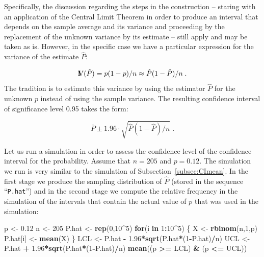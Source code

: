 \documentclass[]{krantz}
\makeatletter
\newenvironment{Shaded}{\begin{snugshade}}{\end{snugshade}}
\newcommand{\ControlFlowTok}[1]{\textcolor[rgb]{0.13,0.29,0.53}{\textbf{#1}}}
\newcommand{\DecValTok}[1]{\textcolor[rgb]{0.00,0.00,0.81}{#1}}
\newcommand{\FloatTok}[1]{\textcolor[rgb]{0.00,0.00,0.81}{#1}}
\newcommand{\KeywordTok}[1]{\textcolor[rgb]{0.13,0.29,0.53}{\textbf{#1}}}
\newcommand{\NormalTok}[1]{#1}
\newcommand{\OperatorTok}[1]{\textcolor[rgb]{0.81,0.36,0.00}{\textbf{#1}}}
\newcommand{\StringTok}[1]{\textcolor[rgb]{0.31,0.60,0.02}{#1}}
\newcommand{\Var}{{\rm I\kern-.3em V}}
\newenvironment{kframe}{%
\medskip{}
\setlength{\fboxsep}{.8em}
 \def\at@end@of@kframe{}%
 \ifinner\ifhmode%
  \def\at@end@of@kframe{\end{minipage}}%
  \begin{minipage}{\columnwidth}%
 \fi\fi%
 \def\FrameCommand##1{\hskip\@totalleftmargin \hskip-\fboxsep
 \colorbox{shadecolor}{##1}\hskip-\fboxsep
     \hskip-\linewidth \hskip-\@totalleftmargin \hskip\columnwidth}%
 \MakeFramed {\advance\hsize-\width
   \@totalleftmargin\z@ \linewidth\hsize
   \@setminipage}}%
 {\par\unskip\endMakeFramed%
 \at@end@of@kframe}
\renewenvironment{Shaded}{\begin{kframe}}{\end{kframe}}
\theoremstyle{definition}
\theoremstyle{definition}
\theoremstyle{definition}
\theoremstyle{remark}
\makeatother
\begin{document}
Specifically, the discussion regarding the steps in the construction --
staring with an application of the Central Limit Theorem in order to
produce an interval that depends on the sample average and its variance
and proceeding by the replacement of the unknown variance by its
estimate -- still apply and may be taken as is. However, in the specific
case we have a particular expression for the variance of the estimate
\(\hat P\):

\[\Var(\hat P) = p(1-p)/n \approx \hat P(1- \hat P) /n\;.\]
The tradition is to estimate this variance by using the estimator
\(\hat P\) for the unknown \(p\) instead of using the sample variance. The
resulting confidence interval of significance level 0.95 takes the form:

\[\bar P \pm 1.96 \cdot\sqrt{ \hat P(1-\hat P)/n}\;.\]

Let us run a simulation in order to assess the confidence level of the
confidence interval for the probability. Assume that \(n=205\) and
\(p=0.12\). The simulation we run is very similar to the simulation of
Subsection~\ref{subsec:CImean}. In the first stage we produce the
sampling distribution of \(\hat P\) (stored in the sequence ``\texttt{P.hat}'') and
in the second stage we compute the relative frequency in the simulation
of the intervals that contain the actual value of \(p\) that was used in
the simulation:

\begin{Shaded}
\begin{Highlighting}[]
\NormalTok{p <-}\StringTok{ }\FloatTok{0.12}
\NormalTok{n <-}\StringTok{ }\DecValTok{205}
\NormalTok{P.hat <-}\StringTok{ }\KeywordTok{rep}\NormalTok{(}\DecValTok{0}\NormalTok{,}\DecValTok{10}\OperatorTok{^}\DecValTok{5}\NormalTok{)}
\ControlFlowTok{for}\NormalTok{(i }\ControlFlowTok{in} \DecValTok{1}\OperatorTok{:}\DecValTok{10}\OperatorTok{^}\DecValTok{5}\NormalTok{) \{}
\NormalTok{  X <-}\StringTok{ }\KeywordTok{rbinom}\NormalTok{(n,}\DecValTok{1}\NormalTok{,p)}
\NormalTok{  P.hat[i] <-}\StringTok{ }\KeywordTok{mean}\NormalTok{(X)}
\NormalTok{\}}
\NormalTok{LCL <-}\StringTok{ }\NormalTok{P.hat }\OperatorTok{-}\StringTok{ }\FloatTok{1.96}\OperatorTok{*}\KeywordTok{sqrt}\NormalTok{(P.hat}\OperatorTok{*}\NormalTok{(}\DecValTok{1}\OperatorTok{-}\NormalTok{P.hat)}\OperatorTok{/}\NormalTok{n)}
\NormalTok{UCL <-}\StringTok{ }\NormalTok{P.hat }\OperatorTok{+}\StringTok{ }\FloatTok{1.96}\OperatorTok{*}\KeywordTok{sqrt}\NormalTok{(P.hat}\OperatorTok{*}\NormalTok{(}\DecValTok{1}\OperatorTok{-}\NormalTok{P.hat)}\OperatorTok{/}\NormalTok{n)}
\KeywordTok{mean}\NormalTok{((p }\OperatorTok{>=}\StringTok{ }\NormalTok{LCL) }\OperatorTok{&}\StringTok{ }\NormalTok{(p }\OperatorTok{<=}\StringTok{ }\NormalTok{UCL))}
\end{Highlighting}
\end{Shaded}
\end{document}
